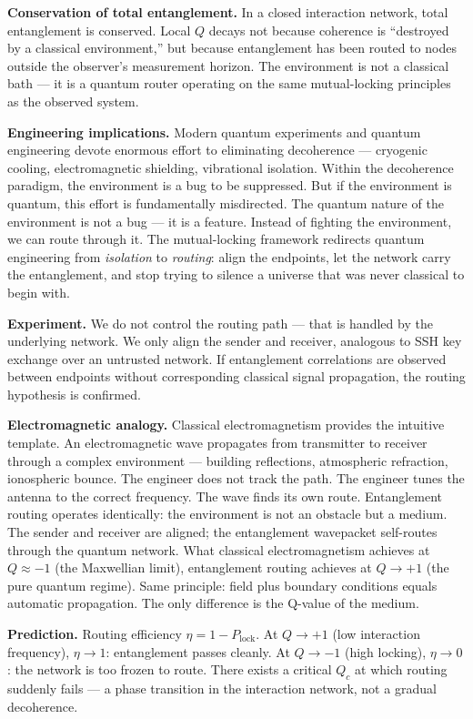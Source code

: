 \documentclass[12pt]{article}
\begin{document}
\textbf{Conservation of total entanglement.} In a closed interaction network, total entanglement is conserved. Local $Q$ decays not because coherence is ``destroyed by a classical environment,'' but because entanglement has been routed to nodes outside the observer's measurement horizon. The environment is not a classical bath — it is a quantum router operating on the same mutual-locking principles as the observed system.

\textbf{Engineering implications.} Modern quantum experiments and quantum engineering devote enormous effort to eliminating decoherence — cryogenic cooling, electromagnetic shielding, vibrational isolation. Within the decoherence paradigm, the environment is a bug to be suppressed. But if the environment is quantum, this effort is fundamentally misdirected. The quantum nature of the environment is not a bug — it is a feature. Instead of fighting the environment, we can route through it. The mutual-locking framework redirects quantum engineering from \textit{isolation} to \textit{routing}: align the endpoints, let the network carry the entanglement, and stop trying to silence a universe that was never classical to begin with.

\textbf{Experiment.} We do not control the routing path — that is handled by the underlying network. We only align the sender and receiver, analogous to SSH key exchange over an untrusted network. If entanglement correlations are observed between endpoints without corresponding classical signal propagation, the routing hypothesis is confirmed.

\textbf{Electromagnetic analogy.} Classical electromagnetism provides the intuitive template. An electromagnetic wave propagates from transmitter to receiver through a complex environment — building reflections, atmospheric refraction, ionospheric bounce. The engineer does not track the path. The engineer tunes the antenna to the correct frequency. The wave finds its own route. Entanglement routing operates identically: the environment is not an obstacle but a medium. The sender and receiver are aligned; the entanglement wavepacket self-routes through the quantum network. What classical electromagnetism achieves at $Q \approx -1$ (the Maxwellian limit), entanglement routing achieves at $Q \to +1$ (the pure quantum regime). Same principle: field plus boundary conditions equals automatic propagation. The only difference is the Q-value of the medium.

\textbf{Prediction.} Routing efficiency $\eta = 1 - P_{\text{lock}}$. At $Q \to +1$ (low interaction frequency), $\eta \to 1$: entanglement passes cleanly. At $Q \to -1$ (high locking), $\eta \to 0$: the network is too frozen to route. There exists a critical $Q_c$ at which routing suddenly fails — a phase transition in the interaction network, not a gradual decoherence.
\end{document}
